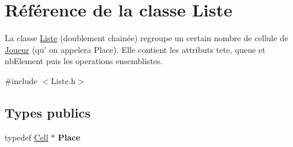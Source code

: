 \hypertarget{class_liste}{\section{\-Référence de la classe \-Liste}
\label{class_liste}
}


\-La classe \hyperlink{class_liste}{\-Liste} (doublement chainée) regroupe un certain nombre de cellule de \hyperlink{class_joueur}{\-Joueur} (qu' on appelera \-Place). \-Elle contient les attributs tete, queue et nb\-Element puis les operations ensemblistes.  




{\ttfamily \#include $<$\-Liste.\-h$>$}

\subsection*{\-Types publics}
\begin{DoxyCompactItemize}
\item 
\hypertarget{class_liste_a9f1c9ec433aaed02dfed67dad053d463}{typedef \hyperlink{class_cell}{\-Cell} $\ast$ {\bfseries \-Place}}\label{class_liste_a9f1c9ec433aaed02dfed67dad053d463}

\end{DoxyCompactItemize}
